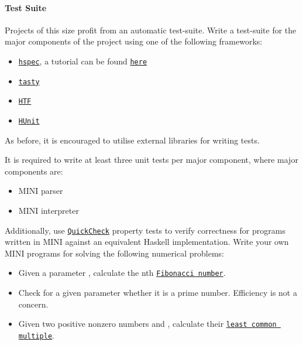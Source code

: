 \documentclass{article}
\begin{document}
\paragraph{Test Suite}

Projects of this size profit from an automatic test-suite. Write a test-suite for the major components of the project using one of the following frameworks:

\begin{itemize}
\item \href{https://hackage.haskell.org/package/hspec}{\texttt{hspec}}, a tutorial can be found \href{https://hspec.github.io/}{\texttt{here}}
\item \href{https://hackage.haskell.org/package/tasty}{\texttt{tasty}}
\item \href{https://hackage.haskell.org/package/HTF}{\texttt{HTF}}
\item \href{https://hackage.haskell.org/package/HUnit}{\texttt{HUnit}}
\end{itemize}

As before, it is encouraged to utilise external libraries for writing tests.

It is required to write at least three unit tests per major component, where major components are:

\begin{itemize}
\item MINI parser
\item MINI interpreter
\end{itemize}

Additionally, use \href{https://hackage.haskell.org/package/QuickCheck}{\texttt{QuickCheck}} property tests to verify correctness for programs written in MINI against an equivalent Haskell implementation. Write your own MINI programs for solving the following numerical problems:

\begin{itemize}
\item Given a parameter , calculate the nth \href{https://en.wikipedia.org/wiki/Fibonacci_number}{\texttt{Fibonacci number}}.
\item Check for a given parameter  whether it is a prime number. Efficiency is not a concern.
\item Given two positive nonzero numbers  and , calculate their \href{https://en.wikipedia.org/wiki/Least_common_multiple}{\texttt{least common multiple}}.
\end{itemize}
\end{document}

